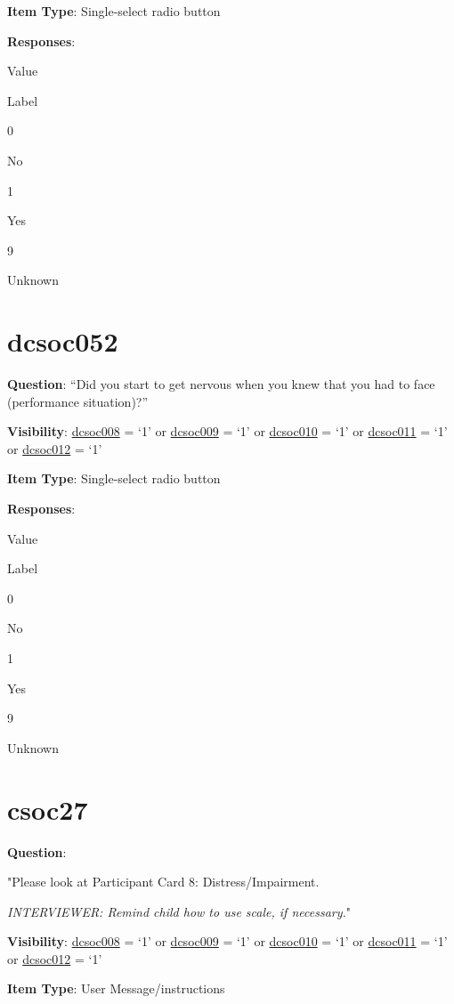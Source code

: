 \documentclass[]{book}
\begin{document}
\textbf{Item Type}: Single-select radio button

\textbf{Responses}:

Value

Label

0

No

1

Yes

9

Unknown

\hypertarget{dcsoc052}{%
\section{dcsoc052}\label{dcsoc052}}

\textbf{Question}: ``Did you start to get nervous when you knew that you had to face (performance situation)?''

\textbf{Visibility}: \protect\hyperlink{dcsoc008}{dcsoc008} = `1' or \protect\hyperlink{dcsoc009}{dcsoc009} = `1' or \protect\hyperlink{dcsoc010}{dcsoc010} = `1' or \protect\hyperlink{dcsoc011}{dcsoc011} = `1' or \protect\hyperlink{dcsoc012}{dcsoc012} = `1'

\textbf{Item Type}: Single-select radio button

\textbf{Responses}:

Value

Label

0

No

1

Yes

9

Unknown

\hypertarget{csoc27}{%
\section{csoc27}\label{csoc27}}

\textbf{Question}:

"Please look at Participant Card 8: Distress/Impairment.

\emph{INTERVIEWER: Remind child how to use scale, if necessary.}"

\textbf{Visibility}: \protect\hyperlink{dcsoc008}{dcsoc008} = `1' or \protect\hyperlink{dcsoc009}{dcsoc009} = `1' or \protect\hyperlink{dcsoc010}{dcsoc010} = `1' or \protect\hyperlink{dcsoc011}{dcsoc011} = `1' or \protect\hyperlink{dcsoc012}{dcsoc012} = `1'

\textbf{Item Type}: User Message/instructions
\end{document}
